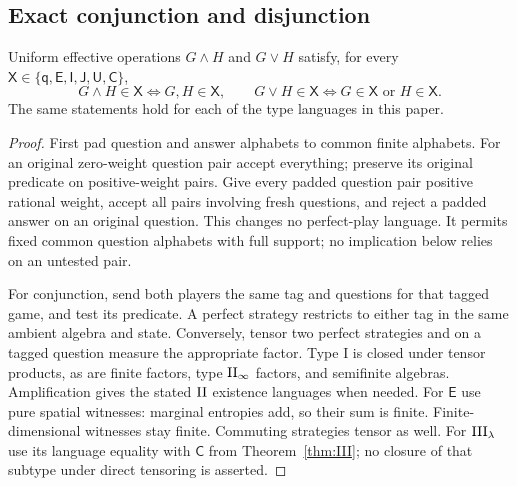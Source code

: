 \subsection{Exact conjunction and disjunction}
\begin{backgroundlemma}
Uniform effective operations $G\wedge H$ and $G\vee H$ satisfy,
for every $\mathsf X\in\{\mathsf q,\mathsf E,\mathsf I,
\mathsf J,\mathsf U,\mathsf C\}$,
\[
 G\wedge H\in\mathsf X\iff G,H\in\mathsf X,\qquad
 G\vee H\in\mathsf X\iff G\in\mathsf X\text{ or }H\in\mathsf X.
\]
The same statements hold for each of the type languages in this paper.
\end{backgroundlemma}
\begin{proof}
First pad question and answer alphabets to common finite alphabets.
For an original zero-weight question pair accept everything; preserve
its original predicate on positive-weight pairs. Give every padded
question pair positive rational weight, accept all pairs involving
fresh questions, and reject a padded answer on an original question.
This changes no perfect-play language. It permits fixed common
question alphabets with full support; no implication below relies on
an untested pair.

For conjunction, send both players the same tag and questions for
that tagged game, and test its predicate. A perfect strategy restricts
to either tag in the same ambient algebra and state. Conversely,
tensor two perfect strategies and on a tagged question measure the
appropriate factor. Type I is closed under tensor products, as are
finite factors, type $\mathrm{II}_\infty$ factors, and semifinite algebras.
Amplification gives the stated $\mathrm{II}$ existence languages when needed.
For $\mathsf E$ use pure spatial witnesses: marginal entropies add,
so their sum is finite. Finite-dimensional witnesses stay finite.
Commuting strategies tensor as well. For $\mathrm{III}_\lambda$ use its
language equality with $\mathsf C$ from Theorem~\ref{thm:III}; no
closure of that subtype under direct tensoring is asserted.


\end{proof}
